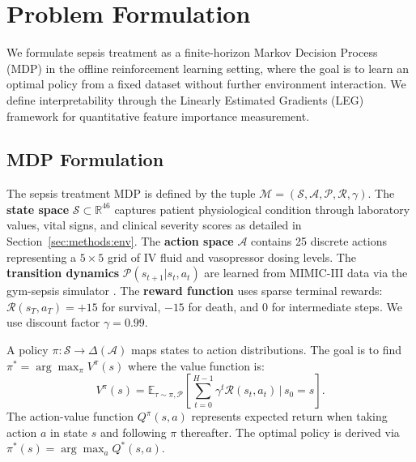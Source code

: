 
\section{Problem Formulation}\label{sec:problem}

We formulate sepsis treatment as a finite-horizon Markov Decision Process (MDP) in the offline reinforcement learning setting, where the goal is to learn an optimal policy from a fixed dataset without further environment interaction. We define interpretability through the Linearly Estimated Gradients (LEG) framework for quantitative feature importance measurement.

\subsection{MDP Formulation}\label{sec:problem:mdp}

The sepsis treatment MDP is defined by the tuple $\mathcal{M} = (\mathcal{S}, \mathcal{A}, \mathcal{P}, \mathcal{R}, \gamma)$. The \textbf{state space} $\mathcal{S} \subset \mathbb{R}^{46}$ captures patient physiological condition through laboratory values, vital signs, and clinical severity scores as detailed in Section~\ref{sec:methods:env}. The \textbf{action space} $\mathcal{A}$ contains 25 discrete actions representing a $5 \times 5$ grid of IV fluid and vasopressor dosing levels. The \textbf{transition dynamics} $\mathcal{P}(s_{t+1} | s_t, a_t)$ are learned from MIMIC-III data via the gym-sepsis simulator \citep{raghu2017sepsis_drl}. The \textbf{reward function} uses sparse terminal rewards: $\mathcal{R}(s_T, a_T) = +15$ for survival, $-15$ for death, and $0$ for intermediate steps. We use discount factor $\gamma = 0.99$.

A policy $\pi: \mathcal{S} \to \Delta(\mathcal{A})$ maps states to action distributions. The goal is to find $\pi^* = \arg\max_\pi V^\pi(s)$ where the value function is:
\begin{equation}
V^\pi(s) = \mathbb{E}_{\tau \sim \pi, \mathcal{P}} \left[ \sum_{t=0}^{H-1} \gamma^t \mathcal{R}(s_t, a_t) \,\Big|\, s_0 = s \right].
\end{equation}
The action-value function $Q^\pi(s, a)$ represents expected return when taking action $a$ in state $s$ and following $\pi$ thereafter. The optimal policy is derived via $\pi^*(s) = \arg\max_a Q^*(s, a)$.


